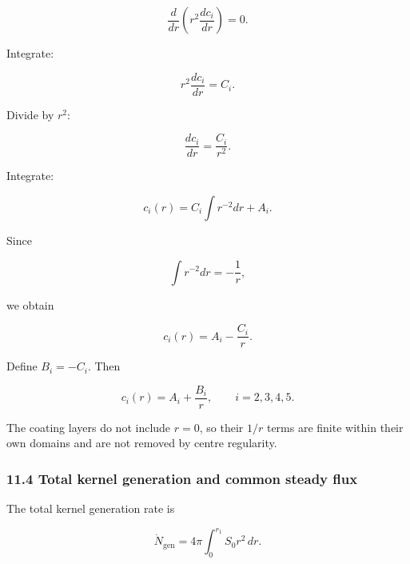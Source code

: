 \documentclass[11pt,a4paper]{article}
\begin{document}
\begin{equation}
\frac{d}{dr}
\left(
r^2\frac{dc_i}{dr}
\right)=0.
\tag{TRISO-ML-327}
\label{eq:triso-ml-327}
\end{equation}

Integrate:

\begin{equation}
r^2\frac{dc_i}{dr}=C_i.
\tag{TRISO-ML-328}
\label{eq:triso-ml-328}
\end{equation}

Divide by $r^2$:

\begin{equation}
\frac{dc_i}{dr}=\frac{C_i}{r^2}.
\tag{TRISO-ML-329}
\label{eq:triso-ml-329}
\end{equation}

Integrate:

\begin{equation}
c_i(r)=C_i\int r^{-2}dr+A_i.
\tag{TRISO-ML-330}
\label{eq:triso-ml-330}
\end{equation}

Since

\begin{equation}
\int r^{-2}dr=-\frac1r,
\tag{TRISO-ML-331}
\label{eq:triso-ml-331}
\end{equation}

we obtain

\begin{equation}
c_i(r)=A_i-\frac{C_i}{r}.
\tag{TRISO-ML-332}
\label{eq:triso-ml-332}
\end{equation}

Define $B_i=-C_i$. Then

\begin{equation}
\boxed{
c_i(r)=A_i+\frac{B_i}{r},
\qquad i=2,3,4,5.
}
\tag{TRISO-ML-333}
\label{eq:triso-ml-333}
\end{equation}

The coating layers do not include $r=0$, so their $1/r$ terms are finite within their own domains and are not removed by centre regularity.

\subsubsection*{11.4 Total kernel generation and common steady flux}

The total kernel generation rate is

\begin{equation}
\dot N_{\mathrm{gen}}
=
4\pi
\int_0^{r_1}
S_0r^2\,dr.
\tag{TRISO-ML-334}
\label{eq:triso-ml-334}
\end{equation}
\end{document}
